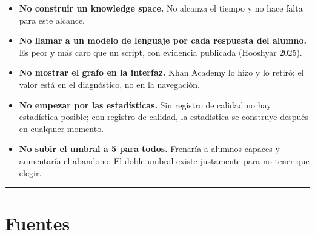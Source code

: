 \documentclass[11pt,a4paper]{article}
\begin{document}
\begin{itemize}
\item \textbf{No construir un knowledge space.} No alcanza el tiempo y no hace falta para este alcance.
\item \textbf{No llamar a un modelo de lenguaje por cada respuesta del alumno.} Es peor y más caro que un script, con evidencia publicada (Hooshyar 2025).
\item \textbf{No mostrar el grafo en la interfaz.} Khan Academy lo hizo y lo retiró; el valor está en el diagnóstico, no en la navegación.
\item \textbf{No empezar por las estadísticas.} Sin registro de calidad no hay estadística posible; con registro de calidad, la estadística se construye después en cualquier momento.
\item \textbf{No subir el umbral a 5 para todos.} Frenaría a alumnos capaces y aumentaría el abandono. El doble umbral existe justamente para no tener que elegir.
\end{itemize}

\vspace{14pt}
\hrule
\vspace{12pt}

\section*{Fuentes}
\end{document}

